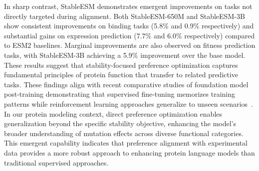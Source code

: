 \documentclass[]{fairmeta}
\begin{document}
In sharp contrast, StableESM demonstrates emergent improvements on tasks not directly targeted during alignment. Both StableESM-650M and StableESM-3B show consistent improvements on binding tasks (5.8\% and 0.9\% respectively) and substantial gains on expression prediction (7.7\% and 6.0\% respectively) compared to ESM2 baselines. Marginal improvements are also observed on fitness prediction tasks, with StableESM-3B achieving a 5.9\% improvement over the base model. These results suggest that stability-focused preference optimization captures fundamental principles of protein function that transfer to related predictive tasks.
These findings align with recent comparative studies of foundation model post-training demonstrating that supervised fine-tuning memorizes training patterns while reinforcement learning approaches generalize to unseen scenarios~\cite{chu2025sft}. In our protein modeling context, direct preference optimization enables generalization beyond the specific stability objective, enhancing the model's broader understanding of mutation effects across diverse functional categories. This emergent capability indicates that preference alignment with experimental data provides a more robust approach to enhancing protein language models than traditional supervised approaches.
\end{document}
